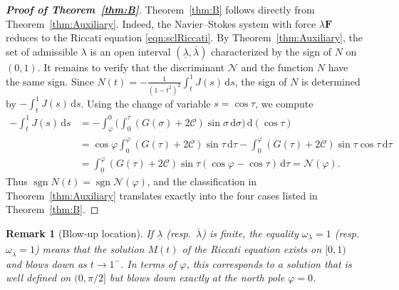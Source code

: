 \documentclass{amsart}
\newtheorem{remark}{Remark}[section]
\newcommand{\vp}{\varphi}
\newcommand{\BF}{{\boldsymbol{F}}}
\newcommand{\mcC}{\mathcal{C}}
\begin{document}
\begin{proof}[\textbf{Proof of Theorem~\ref{thm:B}}]
Theorem~\ref{thm:B} follows directly from Theorem~\ref{thm:Auxiliary}. Indeed, the Navier--Stokes system with force $\lambda\BF$ reduces to the Riccati equation \eqref{eqn:sclRiccati}. By Theorem~\ref{thm:Auxiliary}, the set of admissible $\lambda$ is an open interval $(\underline{\lambda},\overline{\lambda})$ characterized by the sign of $N$ on $(0,1)$.
It remains to verify that the discriminant $\mathcal{N}$ and the function $N$ have the same sign.
Since $N(t)=-\frac{1}{(1-t^{2})^{2}}\int_{t}^{1} J(s)\,\mathrm{d}s$, the sign of $N$ is determined by $-\int_{t}^{1} J(s)\,\mathrm{d}s$.
Using the change of variable $s=\cos\tau$, we compute
\begin{equation}\label{eqn:PfThmB}
\begin{aligned}
-\int_{t}^{1} J(s)\, \mathrm{d}s
&= -\int_{\varphi}^{0} \big( \int_0^{\tau} (G(\sigma) + 2\mcC) \sin \sigma \, \mathrm{d}\sigma \big) \, \mathrm{d}(\cos\tau)\\
&= \cos \varphi \int_0^{\vp} (G(\tau) + 2\mcC) \sin \tau \, \mathrm{d}\tau  - \int_{0}^{\varphi} (G(\tau)+2\mcC)\sin \tau \cos \tau \, \mathrm{d}\tau\\
&= \int_{0}^{\varphi} (G(\tau)+2\mcC) \sin \tau (\cos \varphi - \cos \tau) \, \mathrm{d}\tau = \mathcal{N}(\varphi).
\end{aligned}
\end{equation}
Thus $\operatorname{sgn} N(t) = \operatorname{sgn} \mathcal{N}(\varphi)$, and the classification in Theorem~\ref{thm:Auxiliary} translates exactly into the four cases listed in Theorem~\ref{thm:B}.
\end{proof}

\begin{remark}[Blow-up location]
If $\underline{\lambda}$ (resp.\ $\overline{\lambda}$) is finite, the equality $\omega_{\underline{\lambda}}=1$ (resp.\ $\omega_{\overline{\lambda}}=1$) means that the solution $M(t)$ of the Riccati equation exists on $[0,1)$ and blows down as $t\to 1^{-}$. In terms of $\varphi$, this corresponds to a solution that is well defined on $(0,\pi/2]$ but blows down exactly at the north pole $\varphi=0$.
\end{remark}
\end{document}
